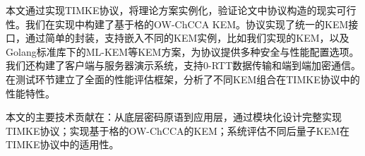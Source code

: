本文通过实现TIMKE协议，将理论方案实例化，验证论文\cite{timke_2024}中协议构造的现实可行性。我们在实现中构建了基于格的OW-ChCCA KEM。协议实现了统一的KEM接口，通过简单的封装，支持嵌入不同的KEM实例，比如我们实现的KEM，以及Golang标准库下的ML-KEM等KEM方案，为协议提供多种安全与性能配置选项。
我们还构建了客户端与服务器演示系统，支持0-RTT数据传输和端到端加密通信。在测试环节建立了全面的性能评估框架，分析了不同KEM组合在TIMKE协议中的性能特性。

本文的主要技术贡献在：从底层密码原语到应用层，通过模块化设计完整实现TIMKE协议；实现基于格的OW-ChCCA的KEM；系统评估不同后量子KEM在TIMKE协议中的适用性。